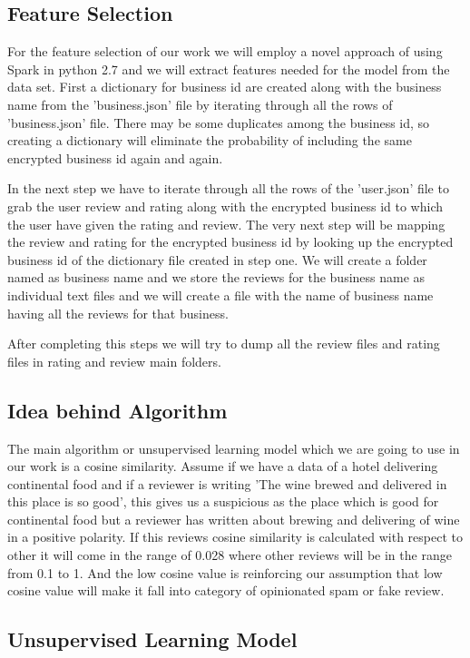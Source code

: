 \documentclass[sigconf]{acmart}
\begin{document}
\subsection{Feature Selection}

For the feature selection of our work we will employ a novel approach of using Spark in python 2.7 and we will extract features needed for the model from the data set. First a dictionary for business id are created along with the business name from the 'business.json' file by iterating through all the rows of 'business.json' file. There may be some duplicates among the business id, so creating a dictionary will eliminate the probability of including the same encrypted business id again and again.

In the next step we have to iterate through all the rows of the 'user.json' file to grab the user review and rating along with the encrypted business id to which the user have given the rating and review. The very next step will be mapping the review and rating for the encrypted business id by looking up the encrypted business id of the dictionary file created in step one. We will create a folder named as business name and we store the reviews for the business name as individual text files and we will create a file with the name of business name having all the reviews for that business. 

After completing this steps we will try to dump all the review files and rating files in rating and review main folders.

\subsection{Idea behind Algorithm}

The main algorithm or unsupervised learning model which we are going to use in our work is a cosine similarity. Assume if we have a data of a hotel delivering continental food and if a reviewer is writing 'The wine brewed and delivered in this place is so good', this gives us a suspicious as the place which is good for continental food but a reviewer has written about brewing and delivering of wine in a positive polarity. If this reviews cosine similarity is calculated with respect to other it will come in the range of 0.028 where other reviews will be in the range from 0.1 to 1. And the low cosine value is reinforcing our assumption that low cosine value will make it fall into category of opinionated spam or fake review.

\subsection{Unsupervised Learning Model}
\end{document}
